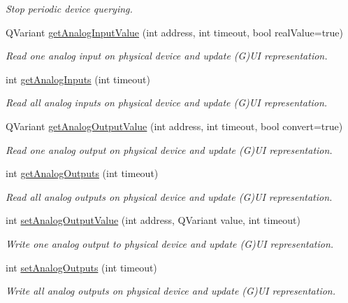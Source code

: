 \begin{DoxyCompactItemize}
\begin{DoxyCompactList}\small\item\em Stop periodic device querying. \end{DoxyCompactList}\item 
QVariant \hyperlink{classmdt_device_a7ff556995f38d2098eda3cf80685b542}{getAnalogInputValue} (int address, int timeout, bool realValue=true)
\begin{DoxyCompactList}\small\item\em Read one analog input on physical device and update (G)UI representation. \end{DoxyCompactList}\item 
int \hyperlink{classmdt_device_a585cc32f6aac4d5788928ecf1fdacf51}{getAnalogInputs} (int timeout)
\begin{DoxyCompactList}\small\item\em Read all analog inputs on physical device and update (G)UI representation. \end{DoxyCompactList}\item 
QVariant \hyperlink{classmdt_device_a4ec0255675f27a48f35edcfd0ba7d129}{getAnalogOutputValue} (int address, int timeout, bool convert=true)
\begin{DoxyCompactList}\small\item\em Read one analog output on physical device and update (G)UI representation. \end{DoxyCompactList}\item 
int \hyperlink{classmdt_device_a12f717202e9860d0c24b9dff8d672ef8}{getAnalogOutputs} (int timeout)
\begin{DoxyCompactList}\small\item\em Read all analog outputs on physical device and update (G)UI representation. \end{DoxyCompactList}\item 
int \hyperlink{classmdt_device_a4b01925cfbbb62e32a3e85a9c4b1538a}{setAnalogOutputValue} (int address, QVariant value, int timeout)
\begin{DoxyCompactList}\small\item\em Write one analog output to physical device and update (G)UI representation. \end{DoxyCompactList}\item 
int \hyperlink{classmdt_device_ae45c39c2ef38b5952171fdc1c3284748}{setAnalogOutputs} (int timeout)
\begin{DoxyCompactList}\small\item\em Write all analog outputs on physical device and update (G)UI representation. \end{DoxyCompactList}\item 

\end{DoxyCompactItemize}

